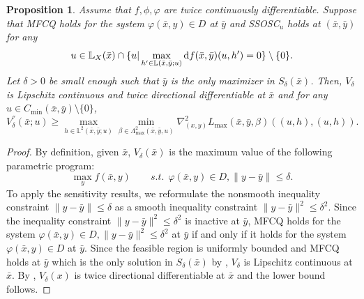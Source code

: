 \documentclass[11pt]{article}
\numberwithin{equation}{section}
\newtheorem{proposition}{Proposition}[section]
\begin{document}
{\begin{proposition}\label{V2diff1}
          {  
    Assume that  $f,\phi, \varphi$ are twice continuously differentiable. Suppose that  MFCQ  holds for the system $\varphi( \bar x,y)\in D$ at  $ \bar y$ and  SSOSC$_u$ holds at $(\bar x,\bar y)$ for any $$u \in \mathbb{L}_X(\bar x) \cap \{u|\max_{h'\in \mathbb{L}(\bar x,\bar y;u)}{\rm d}f(\bar x,\bar y)(u,h')=0\} \setminus \{0\}.$$  Let $\delta>0$ be small enough such that $\bar y$ is the only maximizer in $S_\delta(\bar x)$. 
	 Then, 	$V_{\delta}$ is Lipschitz continuous and 
	 twice directional differentiable} at $\bar x$ and  for   any $u \in C_{\min}(\bar x,\bar y) \setminus \{0\}$,
	$$V^{''}_{\delta}(\bar x;u) \geq \max_{h \in \mathbb{L}^2(\bar x,\bar y;u)}\min_{\beta \in \Lambda^2_{\operatorname{max}}(\bar x,\bar y,u)} \nabla^2_{(x,y)} L_{\operatorname{max}}(\bar x,\bar y,\beta)((u,h),(u,h)).$$
\end{proposition}
\begin{proof}  By definition, given $\bar x$, $V_\delta(\bar x)$ is the maximum value of the following parametric program:
$$\max_y f(\bar x,y) \qquad s.t.\ \  \varphi(\bar x,y)\in D, \|y-\bar y\|\leq \delta.$$
To apply the sensitivity results, we reformulate the nonsmooth inequality constraint  $\|y-\bar y\|\leq \delta$ as a smooth inequality constraint $\|y-\bar y\|^2\leq \delta^2$. Since  the inequality constraint $\|y-\bar y\|^2\leq \delta^2$ is inactive at $\bar y$,     MFCQ holds for the system $\varphi(\bar x,y)\in D, \|y-\bar y\|^2\leq \delta^2 $ at $\bar  y$ if and only if it  holds for the system $\varphi(\bar x,y)\in D$ at $\bar y$. Since the feasible region is uniformly bounded and MFCQ holds at $\bar y$ which is the only solution in $S_\delta(\bar x)$  by  \cite[Theorem 5.1]{Gauvin1982}, $V_\delta$ is Lipschitz continuous at $\bar x$.  By \cite[Theorem 4.2]{Bondarevsky16}, $V_\delta(x)$ is  twice directional differentiable at $\bar x$ and the lower bound follows.
\end{proof}
}
\end{document}
